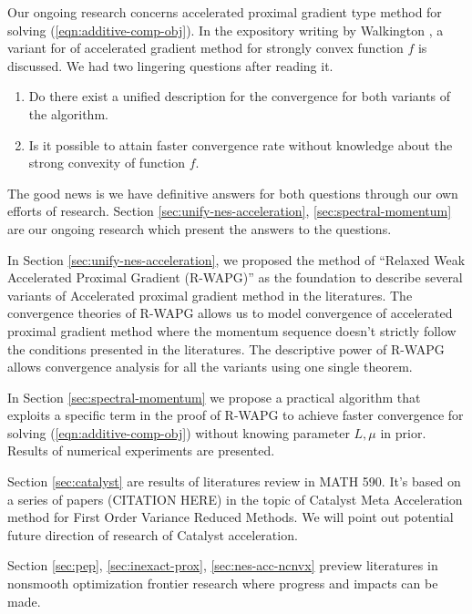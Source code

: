 \documentclass[12pt]{article}
\begin{document}
    \par
    Our ongoing research concerns accelerated proximal gradient type method for solving (\ref{eqn:additive-comp-obj}). 
    In the expository writing by Walkington \cite{noel_nesterovs_nodate}, a variant for of accelerated gradient method for strongly convex function $f$ is discussed. 
    We had two lingering questions after reading it. 
    \begin{enumerate}
        \item Do there exist a unified description for the convergence for both variants of the algorithm. 
        \item Is it possible to attain faster convergence rate without knowledge about the strong convexity of function $f$. 
    \end{enumerate}
    The good news is we have definitive answers for both questions through our own efforts of research. 
    Section \ref{sec:unify-nes-acceleration}, \ref{sec:spectral-momentum} are our ongoing research which present the answers to the questions. 
    \par
    In Section \ref{sec:unify-nes-acceleration}, we proposed the method of ``Relaxed Weak Accelerated Proximal Gradient (R-WAPG)'' as the foundation to describe several variants of Accelerated proximal gradient method in the literatures. 
    The convergence theories of R-WAPG allows us to model convergence of accelerated proximal gradient method where the momentum sequence doesn't strictly follow the conditions presented in the literatures. 
    The descriptive power of R-WAPG allows convergence analysis for all the variants using one single theorem. 
    \par
    In Section \ref{sec:spectral-momentum} we propose a practical algorithm that exploits a specific term in the proof of R-WAPG to achieve faster convergence for solving (\ref{eqn:additive-comp-obj}) without knowing parameter $L, \mu$ in prior. 
    Results of numerical experiments are presented. 
    \par
    Section \ref{sec:catalyst} are results of literatures review in MATH 590. 
    It's based on a series of papers (CITATION HERE) in the topic of Catalyst Meta Acceleration method for First Order Variance Reduced Methods. 
    We will point out potential future direction of research of Catalyst acceleration. 
    \par
    Section \ref{sec:pep}, \ref{sec:inexact-prox}, \ref{sec:nes-acc-ncnvx} preview literatures in  nonsmooth optimization frontier research where progress and impacts can be made.  
\end{document}
